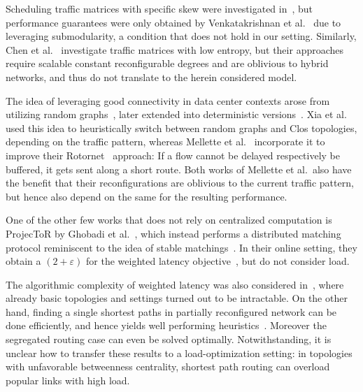 \documentclass[sigconf]{acmart}
\begin{document}
%
Scheduling traffic matrices with specific skew were investigated in~\cite{mordia,solstice,eclipse-journal,lumos}, but performance guarantees were only obtained by Venkatakrishnan et al.~\cite{eclipse-journal} due to leveraging submodularity, a condition that does not hold in our setting.
%
Similarly, Chen et al.~\cite{DBLP:journals/ipl/AvinHLS18,disc17,DBLP:conf/infocom/Avin0019} investigate traffic matrices with low entropy, but their approaches require scalable constant reconfigurable degrees and are oblivious to hybrid networks, and thus do not translate to the herein considered model.
%

%
The idea of leveraging good connectivity in data center contexts arose from utilizing random graphs~\cite{jellyfish}, later extended into deterministic versions~\cite{DBLP:journals/algorithmica/DinitzSV17,DBLP:conf/conext/ValadarskySDS16,Kassing2017}.
%
Xia et al.~\cite{DBLP:conf/sigcomm/XiaSD0HN17} used this idea to heuristically switch between random graphs and Clos topologies, depending on the traffic pattern, whereas Mellette et al.~\cite{opera} incorporate it to improve their Rotornet~\cite{rotornet} approach: If a flow cannot be delayed respectively be buffered, it gets sent along a short route.
Both works of Mellette et al.\ also have the benefit that their reconfigurations are oblivious to the current traffic pattern, but hence also depend on the same for the resulting performance.
%

%
One of the other few works that does not rely on centralized computation is ProjecToR by Ghobadi et al.~\cite{projector}, which instead performs a distributed matching protocol reminiscent to the idea of stable matchings~\cite{noble}.
In their online setting, they obtain a $(2+\varepsilon)$ for the weighted latency objective~\cite{stable-matching-algorithm-agile-reconfigurable-data-center-interconnect}, but do not consider load.
%

%
The algorithmic complexity of weighted latency was also considered in~\cite{DBLP:journals/ccr/FoersterPS19, DBLP:conf/ancs/FoersterGS18}, where already basic topologies and settings turned out to be intractable.
%
On the other hand, finding a single shortest paths in partially reconfigured network can be done efficiently, and hence yields well performing heuristics~\cite{DBLP:conf/networking/FenzF0V19}.
%
Moreover the segregated routing case can even be solved optimally.
%
Notwithstanding, it is unclear how to transfer these results to a load-optimization setting: in topologies with unfavorable betweenness centrality, shortest path routing can overload popular links with high load.
%
\end{document}
